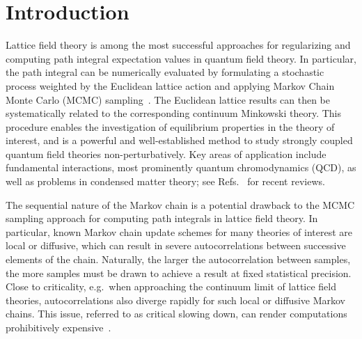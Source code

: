 \documentclass[aps,prd,twocolumn,nofootinbib,superscriptaddress,preprintnumbers]{revtex4-1}
\begin{document}
\date{\today}

\section{Introduction}

Lattice field theory is among the most successful approaches for regularizing and computing path integral expectation values in quantum field theory. In particular, the path integral can be numerically evaluated by formulating a stochastic process weighted by the Euclidean lattice action and applying Markov Chain Monte Carlo (MCMC) sampling~\cite{Morningstar:2007zm}. The Euclidean lattice results can then be systematically related to the corresponding continuum Minkowski theory. This procedure enables the investigation of equilibrium properties in the theory of interest, and is a powerful and well-established method to study strongly coupled quantum field theories non-perturbatively. Key areas of application include fundamental interactions, most prominently quantum chromodynamics (QCD), as well as problems in condensed matter theory; see Refs.~\cite{Brower:2019oor,Lehner:2019wvv,Kronfeld:2019nfb,Cirigliano:2019jig,Detmold:2019ghl,Bazavov:2019lgz,Mathur:2016cko,Joo:2019byq} for recent reviews.

The sequential nature of the Markov chain is a potential drawback to the MCMC sampling approach for computing path integrals in lattice field theory. In particular, known Markov chain update schemes for many theories of interest are local or diffusive, which can result in severe autocorrelations between successive elements of the chain. Naturally, the larger the autocorrelation between samples, the more samples must be drawn to achieve a result at fixed statistical precision. Close to criticality, e.g.~when approaching the continuum limit of lattice field theories, autocorrelations also diverge rapidly for such local or diffusive Markov chains. This issue, referred to as critical slowing down, can render computations prohibitively expensive~\cite{Wolff:1989wq,Schaefer:2009xx,Schaefer:2010hu}.
\end{document}
